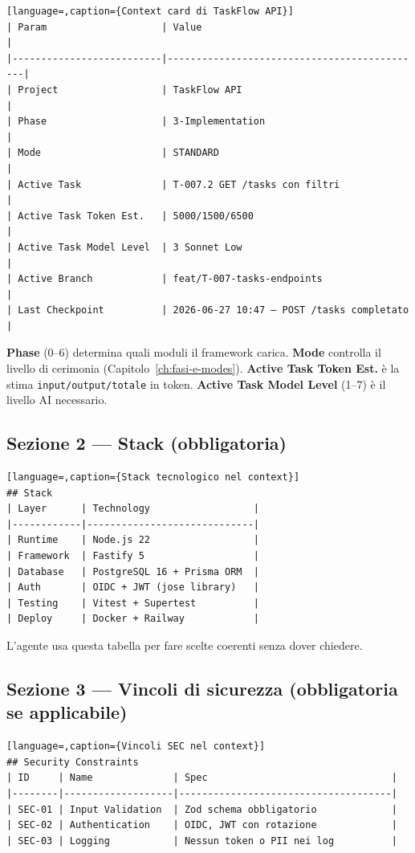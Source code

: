 \begin{lstlisting}[language=,caption={Context card di TaskFlow API}]
| Param                    | Value                                       |
|--------------------------|---------------------------------------------|
| Project                  | TaskFlow API                                |
| Phase                    | 3-Implementation                            |
| Mode                     | STANDARD                                    |
| Active Task              | T-007.2 GET /tasks con filtri               |
| Active Task Token Est.   | 5000/1500/6500                              |
| Active Task Model Level  | 3 Sonnet Low                                |
| Active Branch            | feat/T-007-tasks-endpoints                  |
| Last Checkpoint          | 2026-06-27 10:47 — POST /tasks completato   |
\end{lstlisting}

\textbf{Phase} (0--6) determina quali moduli il framework carica. \textbf{Mode} controlla il livello di cerimonia (Capitolo~\ref{ch:fasi-e-modes}). \textbf{Active Task Token Est.} è la stima \texttt{input/output/totale} in token. \textbf{Active Task Model Level} (1--7) è il livello AI necessario.

\subsection*{Sezione 2 --- Stack (obbligatoria)}

\begin{lstlisting}[language=,caption={Stack tecnologico nel context}]
## Stack
| Layer      | Technology                  |
|------------|-----------------------------|
| Runtime    | Node.js 22                  |
| Framework  | Fastify 5                   |
| Database   | PostgreSQL 16 + Prisma ORM  |
| Auth       | OIDC + JWT (jose library)   |
| Testing    | Vitest + Supertest          |
| Deploy     | Docker + Railway            |
\end{lstlisting}

L'agente usa questa tabella per fare scelte coerenti senza dover chiedere.

\subsection*{Sezione 3 --- Vincoli di sicurezza (obbligatoria se applicabile)}

\begin{lstlisting}[language=,caption={Vincoli SEC nel context}]
## Security Constraints
| ID     | Name              | Spec                                |
|--------|-------------------|-------------------------------------|
| SEC-01 | Input Validation  | Zod schema obbligatorio             |
| SEC-02 | Authentication    | OIDC, JWT con rotazione             |
| SEC-03 | Logging           | Nessun token o PII nei log          |
\end{lstlisting}


